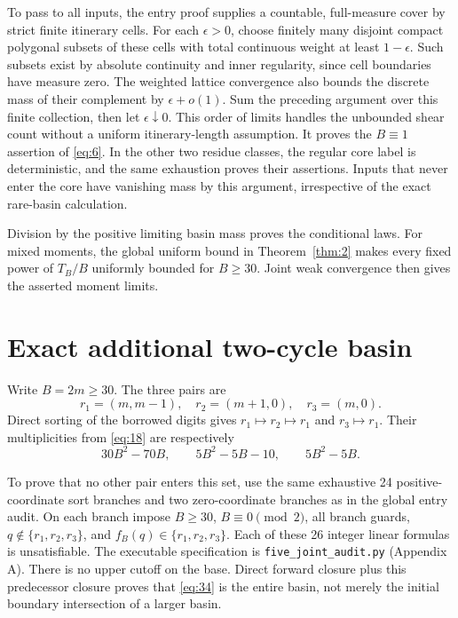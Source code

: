 \documentclass[11pt]{amsart}
\begin{document}
To pass to all inputs, the entry proof supplies a countable, full-measure cover by strict finite itinerary cells. For each \(\epsilon>0\), choose finitely many disjoint compact polygonal subsets of these cells with total continuous weight at least \(1-\epsilon\). Such subsets exist by absolute continuity and inner regularity, since cell boundaries have measure zero. The weighted lattice convergence also bounds the discrete mass of their complement by \(\epsilon+o(1)\). Sum the preceding argument over this finite collection, then let \(\epsilon\downarrow0\). This order of limits handles the unbounded shear count without a uniform itinerary-length assumption. It proves the \(B\equiv1\) assertion of \eqref{eq:6}. In the other two residue classes, the regular core label is deterministic, and the same exhaustion proves their assertions. Inputs that never enter the core have vanishing mass by this argument, irrespective of the exact rare-basin calculation.

Division by the positive limiting basin mass proves the conditional laws. For mixed moments, the global uniform bound in Theorem~\ref{thm:2} makes every fixed power of \(T_B/B\) uniformly bounded for \(B\ge30\). Joint weak convergence then gives the asserted moment limits.

\section{Exact additional two-cycle basin}

Write \(B=2m\ge30\). The three pairs are \begin{equation}\label{eq:34}
r_1=(m,m-1),\quad r_2=(m+1,0),\quad r_3=(m,0).
\end{equation} Direct sorting of the borrowed digits gives \(r_1\mapsto r_2\mapsto r_1\) and \(r_3\mapsto r_1\). Their multiplicities from \eqref{eq:18} are respectively \begin{equation}\label{eq:35}
30B^2-70B,\qquad 5B^2-5B-10,\qquad 5B^2-5B.
\end{equation}

To prove that no other pair enters this set, use the same exhaustive 24 positive-coordinate sort branches and two zero-coordinate branches as in the global entry audit. On each branch impose \(B\ge30\), \(B\equiv0\pmod2\), all branch guards, \(q\notin\{r_1,r_2,r_3\}\), and \(f_B(q)\in\{r_1,r_2,r_3\}\). Each of these 26 integer linear formulas is unsatisfiable. The executable specification is \texttt{five\_joint\_audit.py} (Appendix A). There is no upper cutoff on the base. Direct forward closure plus this predecessor closure proves that \eqref{eq:34} is the entire basin, not merely the initial boundary intersection of a larger basin.
\end{document}
